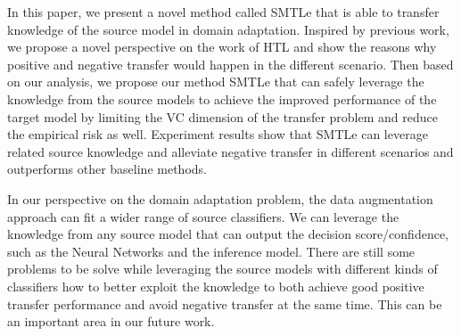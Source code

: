 In this paper, we present a novel method called SMTLe that is able to transfer knowledge of the source model in domain adaptation. Inspired by previous work,
we propose a novel perspective on the work of HTL and show the reasons why positive and negative transfer would happen in the different scenario. Then based on our analysis, we propose our method SMTLe that can safely leverage the knowledge from the source models to achieve the improved performance of the target model by limiting the VC dimension of the transfer problem and reduce the empirical risk as well. Experiment results show that SMTLe can leverage related source knowledge and alleviate negative transfer in different scenarios and outperforms other baseline methods.

In our perspective on the domain adaptation problem, the data augmentation approach can fit a wider range of source classifiers. We can leverage the knowledge from any source model that can output the decision score/confidence, such as the Neural Networks and the inference model. There are still some problems to be solve while leveraging the source models with different kinds of classifiers how to better exploit the knowledge to both achieve good positive transfer performance and avoid negative transfer at the same time. This can be an important area in our future work.

